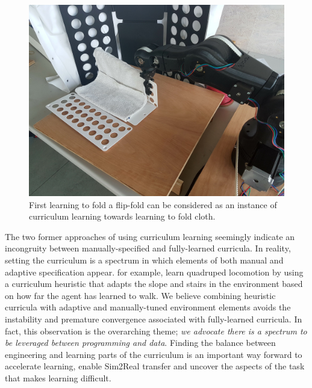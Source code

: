 \documentclass[\home/main.tex]{subfiles}
\begin{document}
\begin{figure}[!htpb]
    \includegraphics[width=\textwidth]{figures/flipfold_moveo.jpg}
    \caption[Illustration of folding with a flip-fold.]{First learning to fold a flip-fold can be considered as an instance of curriculum learning towards learning to fold cloth.}
    \label{fig:towards_flipfold}
\end{figure}

The two former approaches of using curriculum learning seemingly indicate an incongruity between manually-specified and fully-learned curricula. In reality, setting the curriculum is a spectrum in which elements of both manual and adaptive specification appear. \textcite{rudin2021learning} for example, learn quadruped locomotion by using a curriculum heuristic that adapts the slope and stairs in the environment based on how far the agent has learned to walk.
We believe combining heuristic curricula with adaptive and manually-tuned environment elements avoids the instability and premature convergence associated with fully-learned curricula.
In fact, this observation is the overarching theme; \emph{we advocate there is a spectrum to be leveraged between programming and data}. Finding the balance between engineering and learning parts of the curriculum is an important way forward to accelerate learning, enable Sim2Real transfer and uncover the aspects of the task that makes learning difficult.
\end{document}
